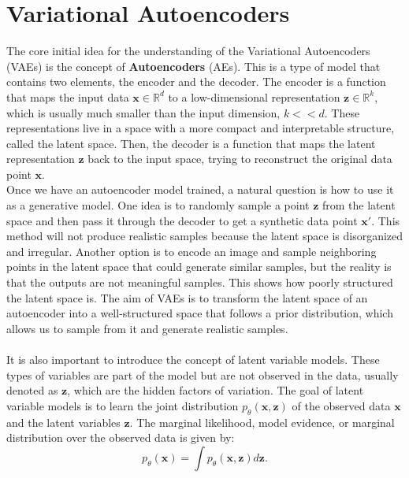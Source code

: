 \chapter{Variational Autoencoders}\label{ch:vaes}

The core initial idea for the understanding of the Variational Autoencoders (VAEs) is the concept of \textbf{Autoencoders} (AEs). 
This is a type of model that contains two elements, the encoder and the decoder. The encoder is a function that maps the input data 
$\mathbf{x}\in\mathbb{R}^d$ to a low-dimensional representation $\mathbf{z}\in\mathbb{R}^k$, which is usually much smaller than
the input dimension, $k<<d$. These representations live in a space with a more compact and interpretable structure, called the latent space. 
Then, the decoder is a function that maps the latent representation $\mathbf{z}$ back to the input space, trying to reconstruct the 
original data point $\mathbf{x}$. \\
Once we have an autoencoder model trained, a natural question is how to use it as a generative model. One idea is to randomly sample
a point $\mathbf{z}$ from the latent space and then pass it through the decoder to get a synthetic data point $\mathbf{x'}$. This method will 
not produce realistic samples because the latent space is disorganized and irregular. Another option is to encode an image and sample 
neighboring points in the latent space that could generate similar samples, but the reality is that the outputs are not meaningful samples. This 
shows how poorly structured the latent space is. The aim of VAEs is to transform the latent space of an autoencoder into a well-structured space 
that follows a prior distribution, which allows us to sample from it and generate realistic samples. \\
\\
It is also important to introduce the concept of latent variable models. These types of variables are part of the model 
but are not observed in the data, usually denoted as $\mathbf{z}$, which are the hidden factors of variation. The goal of latent variable models is to 
learn the joint distribution $p_{\theta}(\mathbf{x}, \mathbf{z})$ of the observed data $\mathbf{x}$ and the latent variables $\mathbf{z}$. 
The marginal likelihood, model evidence, or marginal distribution over the observed data is given by:
\begin{equation}\label{eq:p_x}
    p_{\theta}(\mathbf{x}) = \int p_{\theta}(\mathbf{x}, \mathbf{z}) d\mathbf{z}.
\end{equation}
